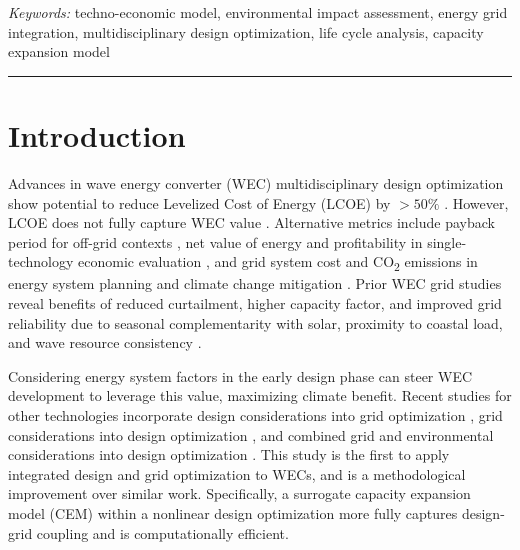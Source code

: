 \documentclass[10pt,twoside]{article}
\begin{document}
\vspace{.5\baselineskip}
\textit{Keywords:} techno-economic model, environmental impact assessment, energy grid integration, multidisciplinary design optimization, life cycle analysis, capacity expansion model

\noindent\rule{\textwidth}{0.4pt}

\section{Introduction}
Advances in wave energy converter (WEC) multidisciplinary design optimization show potential to reduce Levelized Cost of Energy (LCOE) by $>50\%$ \cite{mccabe_leveraging_2025}.
However, LCOE does not fully capture WEC value \cite{mowers_evaluation_2021,moraski_beyond_2025}.
Alternative metrics include payback period for off-grid contexts \cite{jenne_powering_2021}, net value of energy and profitability in single-technology economic evaluation \cite{mowers_evaluation_2021,makaremi_economic_2025}, and grid system cost and CO\textsubscript{2} emissions in energy system planning and climate change mitigation \cite{moraski_beyond_2025}.
Prior WEC grid studies reveal benefits of reduced curtailment, higher capacity factor, and improved grid reliability due to seasonal complementarity with solar, proximity to coastal load, and wave resource consistency \cite{akdemir_opportunities_2023,bhattacharya_timing_2021,pennock_temporal_2022}.

Considering energy system factors in the early design phase can steer WEC development to leverage this value, maximizing climate benefit.
Recent studies for other technologies incorporate design considerations into grid optimization \cite{schwartz_value_2023,ricks_value_2022}, grid considerations into design optimization \cite{mehta_designing_2024}, and combined grid and environmental considerations into design optimization \cite{canet_eco-conscious_2023,kainz_how_2024}.
This study is the first to apply integrated design and grid optimization to WECs, and is a methodological improvement over similar work. 
Specifically, a surrogate capacity expansion model (CEM) within a nonlinear design optimization more fully captures design-grid coupling and is computationally efficient.
\end{document}
